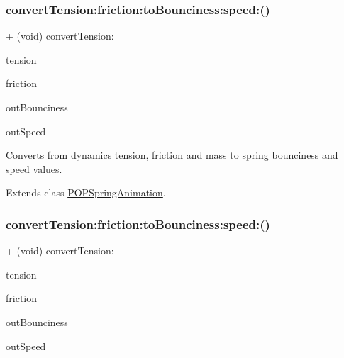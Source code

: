 \subsubsection{\texorpdfstring{convert\+Tension\+:friction\+:to\+Bounciness\+:speed\+:()}{convertTension:friction:toBounciness:speed:()}\hspace{0.1cm}{\footnotesize\ttfamily [1/3]}}
{\footnotesize\ttfamily + (void) convert\+Tension\+: \begin{DoxyParamCaption}\item[{(C\+G\+Float)}]{tension }\item[{friction:(C\+G\+Float)}]{friction }\item[{toBounciness:(C\+G\+Float $\ast$)}]{out\+Bounciness }\item[{speed:(C\+G\+Float $\ast$)}]{out\+Speed }\end{DoxyParamCaption}}

Converts from dynamics tension, friction and mass to spring bounciness and speed values. 

Extends class \mbox{\hyperlink{interface_p_o_p_spring_animation_a6b5d0ffdb16b10c6de3575d9d45b831b}{P\+O\+P\+Spring\+Animation}}.

\mbox{\label{category_p_o_p_spring_animation_07_p_o_p_animation_extras_08_a6b5d0ffdb16b10c6de3575d9d45b831b}} 
\subsubsection{\texorpdfstring{convert\+Tension\+:friction\+:to\+Bounciness\+:speed\+:()}{convertTension:friction:toBounciness:speed:()}\hspace{0.1cm}{\footnotesize\ttfamily [2/3]}}
{\footnotesize\ttfamily + (void) convert\+Tension\+: \begin{DoxyParamCaption}\item[{(C\+G\+Float)}]{tension }\item[{friction:(C\+G\+Float)}]{friction }\item[{toBounciness:(C\+G\+Float $\ast$)}]{out\+Bounciness }\item[{speed:(C\+G\+Float $\ast$)}]{out\+Speed }\end{DoxyParamCaption}}

